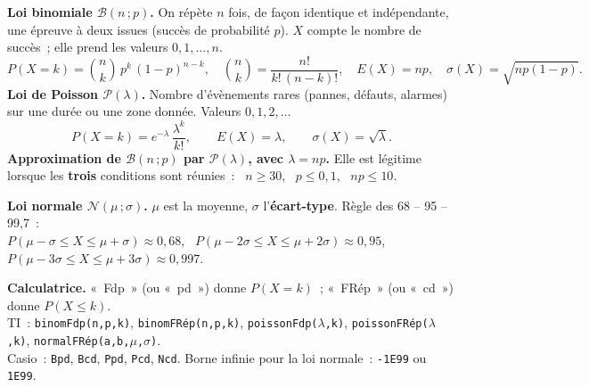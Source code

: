 \documentclass[a4paper,11pt]{article}
\begin{document}
\begin{rappel}
\textbf{Loi binomiale $\mathcal{B}(n\,;p)$.} On répète $n$ fois, de façon identique et indépendante, une épreuve à deux issues (succès de probabilité $p$). $X$ compte le nombre de succès~; elle prend les valeurs $0, 1, \dots, n$.
\[
P(X = k) = \binom{n}{k}\,p^{k}\,(1-p)^{n-k},\quad \binom{n}{k} = \frac{n!}{k!\,(n-k)!},\quad E(X) = np,\quad \sigma(X) = \sqrt{np(1-p)}.
\]
\textbf{Loi de Poisson $\mathcal{P}(\lambda)$.} Nombre d'évènements rares (pannes, défauts, alarmes) sur une durée ou une zone donnée. Valeurs $0, 1, 2, \dots$
\[
P(X = k) = e^{-\lambda}\,\frac{\lambda^{k}}{k!},\qquad E(X) = \lambda,\qquad \sigma(X) = \sqrt{\lambda}.
\]
\textbf{Approximation de $\mathcal{B}(n\,;p)$ par $\mathcal{P}(\lambda)$, avec $\lambda = np$.} Elle est légitime lorsque les \textbf{trois} conditions sont réunies~: \ $n \geq 30$, \ $p \leq 0{,}1$, \ $np \leq 10$.

\smallskip
\textbf{Loi normale $\mathcal{N}(\mu\,;\sigma)$.} $\mu$ est la moyenne, $\sigma$ l'\textbf{écart-type}. Règle des 68 -- 95 -- 99,7~:\\
$P(\mu-\sigma\leq X\leq\mu+\sigma)\approx 0{,}68$, \ $P(\mu-2\sigma\leq X\leq\mu+2\sigma)\approx 0{,}95$, \ $P(\mu-3\sigma\leq X\leq\mu+3\sigma)\approx 0{,}997$.

\smallskip
\textbf{Calculatrice.} «~Fdp~» (ou «~pd~») donne $P(X = k)$~; «~FRép~» (ou «~cd~») donne $P(X \leq k)$.\\
{\small TI~: \texttt{binomFdp(n,p,k)}, \texttt{binomFRép(n,p,k)}, \texttt{poissonFdp($\lambda$,k)}, \texttt{poissonFRép($\lambda$,k)}, \texttt{normalFRép(a,b,$\mu$,$\sigma$)}.\\
Casio~: \texttt{Bpd}, \texttt{Bcd}, \texttt{Ppd}, \texttt{Pcd}, \texttt{Ncd}. \quad Borne infinie pour la loi normale~: \texttt{-1E99} ou \texttt{1E99}.}
\end{rappel}

\newpage
\end{document}
